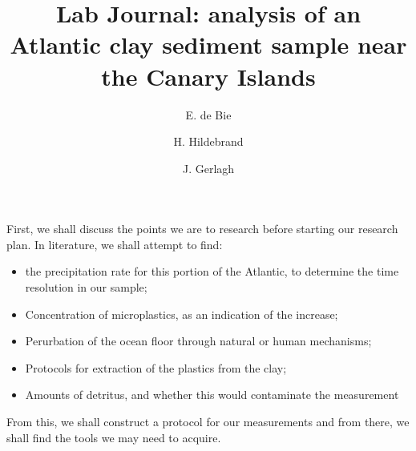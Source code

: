 \documentclass[twocolumn,a4paper,aps,amsmath,amssymb,floatfix,superscriptaddress]{revtex4-2}
\begin{document}
	
	\title{Lab Journal: analysis of an Atlantic clay sediment sample near the Canary Islands}
	\author{E. de Bie}
	
	\author{H. Hildebrand}
	
	\author{J. Gerlagh}
	\maketitle
	
	First, we shall discuss the points we are to research before starting our research plan. 
	In literature, we shall attempt to find:
	\begin{itemize}
		\item the precipitation rate for this portion of the Atlantic, to determine the time resolution in our sample;
		\item Concentration of microplastics, as an indication of the increase;
		\item Perurbation of the ocean floor through natural or human mechanisms;
		\item Protocols for extraction of the plastics from the clay;
		\item Amounts of detritus, and whether this would contaminate the measurement
	\end{itemize}
	From this, we shall construct a protocol for our measurements and from there, we shall find the tools we may need to acquire.
\end{document}
